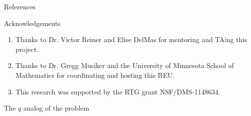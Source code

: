 \documentclass{beamer}
\theoremstyle{remark}
\begin{document}
\begin{frame}{References}
\nocite{quotients_stanley}
\nocite{algebraic_stanley}


\end{frame}


\begin{frame}{Acknowledgements}
\begin{enumerate}
\item Thanks to Dr. Victor Reiner and Elise DelMas for mentoring and TAing this project.
\item Thanks to Dr. Gregg Musiker and the University of Minnesota School of Mathematics for coordinating and hosting this REU.
\item This research was supported by the RTG grant NSF/DMS-1148634.
\end{enumerate}
\end{frame}





\begin{frame}{The $q$ analog of the problem}

\end{frame}
\end{document}
